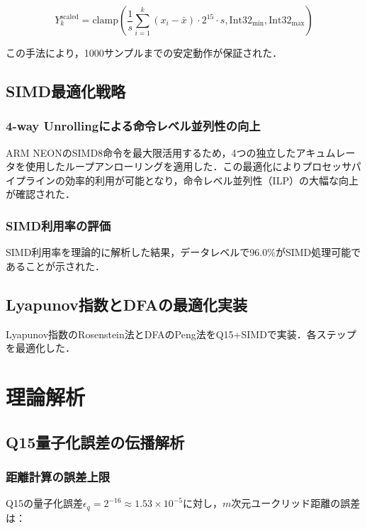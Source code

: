 \documentclass[paper]{ieicej}
\begin{document}
\begin{equation}
Y_k^{\text{scaled}} = \text{clamp}\left(\frac{1}{s} \sum_{i=1}^{k} (x_i - \bar{x}) \cdot 2^{15} \cdot s, \text{Int32}_{\min}, \text{Int32}_{\max}\right)
\end{equation}

この手法により，1000サンプルまでの安定動作が保証された．

\subsection{SIMD最適化戦略}

\subsubsection{4-way Unrollingによる命令レベル並列性の向上}
ARM NEONのSIMD8命令を最大限活用するため，4つの独立したアキュムレータを使用したループアンローリングを適用した．この最適化によりプロセッサパイプラインの効率的利用が可能となり，命令レベル並列性（ILP）の大幅な向上が確認された．

\subsubsection{SIMD利用率の評価}
SIMD利用率を理論的に解析した結果，データレベルで96.0\%がSIMD処理可能であることが示された．

\subsection{Lyapunov指数とDFAの最適化実装}

Lyapunov指数のRosenstein法\cite{rosenstein1993}とDFAのPeng法\cite{peng1994}をQ15+SIMDで実装．各ステップを最適化した．

\section{理論解析}

\subsection{Q15量子化誤差の伝播解析}

\subsubsection{距離計算の誤差上限}
Q15の量子化誤差$\epsilon_q = 2^{-16} \approx 1.53 \times 10^{-5}$に対し，$m$次元ユークリッド距離の誤差は：
\end{document}
